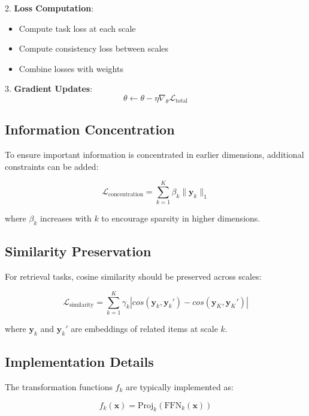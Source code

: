 2. \textbf{Loss Computation}:
   \begin{itemize}
       \item Compute task loss at each scale
       \item Compute consistency loss between scales
       \item Combine losses with weights
   \end{itemize}

3. \textbf{Gradient Updates}:
   \begin{equation}
       \theta \leftarrow \theta - \eta \nabla_\theta \mathcal{L}_{\text{total}}
   \end{equation}

\subsection{Information Concentration}

To ensure important information is concentrated in earlier dimensions, additional constraints can be added:

\begin{equation}
    \mathcal{L}_{\text{concentration}} = \sum_{k=1}^K \beta_k \|\mathbf{y}_k\|_1
\end{equation}

where $\beta_k$ increases with $k$ to encourage sparsity in higher dimensions.

\subsection{Similarity Preservation}

For retrieval tasks, cosine similarity should be preserved across scales:

\begin{equation}
    \mathcal{L}_{\text{similarity}} = \sum_{k=1}^K \gamma_k |cos(\mathbf{y}_k, \mathbf{y}_k') - cos(\mathbf{y}_K, \mathbf{y}_K')|
\end{equation}

where $\mathbf{y}_k$ and $\mathbf{y}_k'$ are embeddings of related items at scale $k$.

\subsection{Implementation Details}

The transformation functions $f_k$ are typically implemented as:

\begin{equation}
    f_k(\mathbf{x}) = \text{Proj}_k(\text{FFN}_k(\mathbf{x}))
\end{equation}

